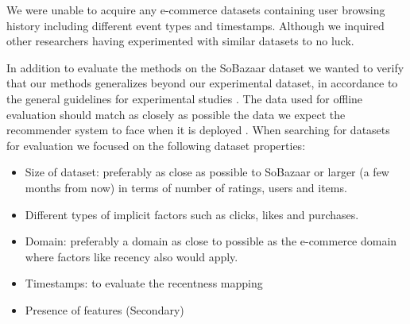 We were unable to acquire any e-commerce datasets containing user browsing history including different
event types and timestamps. Although we inquired other researchers having experimented with similar
datasets to no luck.

In addition to evaluate the methods on the SoBazaar dataset we wanted to verify that our
methods generalizes beyond our experimental dataset, in accordance to the general guidelines
for experimental studies \cite{Shani2011}. The data used for offline evaluation should match
as closely as possible the data we expect the recommender system to face when it is
deployed \cite{Gunawardana2009}. When searching for datasets for evaluation we focused on the
following dataset properties:

\begin{itemize}
	\item Size of dataset: preferably as close as possible to SoBazaar or larger (a few months from now)
	in terms of number of ratings, users and items.
	\item Different types of implicit factors such as clicks, likes and purchases.
	\item Domain: preferably a domain as close to possible as the e-commerce domain where
	factors like recency also would apply.
	\item Timestamps: to evaluate the recentness mapping
	\item Presence of features (Secondary)
\end{itemize}





